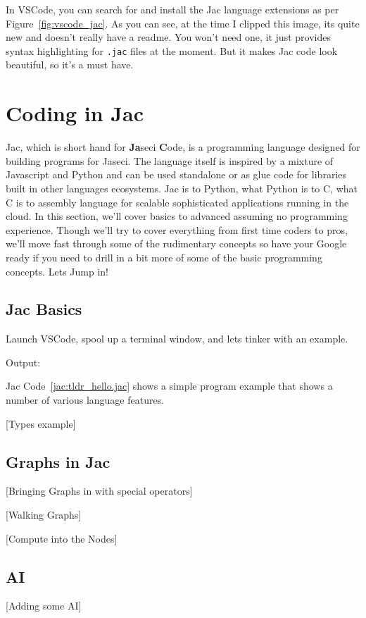 \par
In VSCode, you can search for and install the Jac language extensions as per Figure~\ref{fig:vscode_jac}. As you can see, at the time I clipped this image, its quite new and doesn't really have a readme. You won't need one, it just provides syntax highlighting for \texttt{.jac} files at the moment. But it makes Jac code look beautiful, so it's a must have.

\section{Coding in Jac}

Jac, which is short hand for \textbf{Ja}seci \textbf{C}ode,  is a programming language designed for building programs for Jaseci. The language itself is inspired by a mixture of Javascript and Python and can be used standalone or as glue code for libraries built in other languages ecosystems. Jac is to Python, what Python is to C, what C is to assembly language for scalable sophisticated applications running in the cloud. In this section, we'll cover basics to advanced assuming no programming experience. Though we'll try to cover everything from first time coders to pros, we'll move fast through some of the rudimentary concepts so have your Google ready if you need to drill in a bit more of some of the basic programming concepts. Lets Jump in!

\subsection{Jac Basics}

Launch VSCode, spool up a terminal window, and lets tinker with an example.
\par
{}
Output:

Jac Code~\ref{jac:tldr_hello.jac} shows a simple program example that shows a number of various language features.

[Types example]

\subsection{Graphs in Jac}
[Bringing Graphs in with special operators]

[Walking Graphs]

[Compute into the Nodes]

\subsection{AI}

[Adding some AI]

